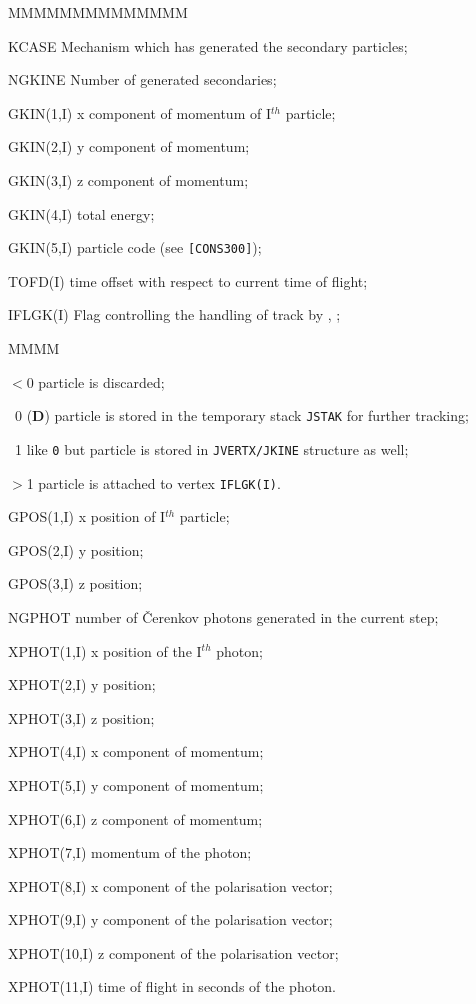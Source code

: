 \begin{DLtt}{MMMMMMMMMMMMMM}
\item[KCASE] Mechanism which has generated the secondary particles;
\item[NGKINE]Number of generated secondaries;
\item[GKIN(1,I)]x component of momentum of I$^{th}$ particle;
\item[GKIN(2,I)]y component of momentum;
\item[GKIN(3,I)]z component of momentum;
\item[GKIN(4,I)]total energy;
\item[GKIN(5,I)]particle code (see {\tt [CONS300]});
\item[TOFD(I)]time offset with respect to current time of flight;
\item[IFLGK(I)]Flag controlling the handling of track by 
, ;
\begin{DLtt}{MMMM}
\item[$<$0]particle is discarded;
\item[~0]({\bf D}) particle is stored in the temporary stack {\tt JSTAK}
for further tracking;
\item[~1] like {\tt 0} but
particle is stored in {\tt JVERTX/JKINE} structure as well;
\item[$>$1] particle is attached to vertex {\tt IFLGK(I)}.
\end{DLtt}
\item[GPOS(1,I)] x position of I$^{th}$ particle;
\item[GPOS(2,I)] y position;
\item[GPOS(3,I)] z position;
\item[NGPHOT] number of \v{C}erenkov photons generated in the current
step;
\item[XPHOT(1,I)] x position of the I$^{th}$ photon;
\item[XPHOT(2,I)] y position;
\item[XPHOT(3,I)] z position;
\item[XPHOT(4,I)] x component of momentum;
\item[XPHOT(5,I)] y component of momentum;
\item[XPHOT(6,I)] z component of momentum;
\item[XPHOT(7,I)] momentum of the photon;
\item[XPHOT(8,I)] x component of the polarisation vector;
\item[XPHOT(9,I)] y component of the polarisation vector;
\item[XPHOT(10,I)] z component of the polarisation vector;
\item[XPHOT(11,I)] time of flight in seconds of the photon.
\end{DLtt}

